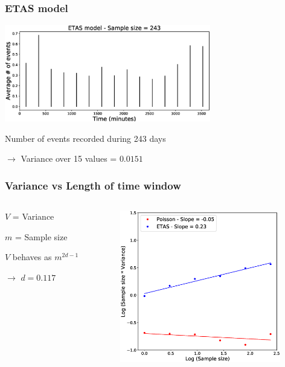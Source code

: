 \documentclass{beamer}
\begin{document}
	\begin{frame}
		\frametitle{ETAS model}
		\begin{center}
			\includegraphics[width=9cm, trim={1cm 0cm 3cm 0cm}, clip]{longrange/ETAS_6.eps}
		\end{center}
		Number of events recorded during 243 days

		$\rightarrow$ Variance over 15 values = $0.0151$
	\end{frame}

	\begin{frame}
		\frametitle{Variance vs Length of time window}
		\begin{columns}[c]
			\begin{column}{4cm}
				$V$ = Variance

				\vspace{1em}

				$m$ = Sample size

				\vspace{1em}

				$V$ behaves as $m^{2 d - 1}$

				\vspace{1em}

				$\rightarrow$ $d =  0.117$
			\end{column}
			\begin{column}{7cm}
				\begin{center}
					\includegraphics[width=7cm, trim={0cm 1cm 2cm 2cm}, clip]{longrange/comparison_2.eps}
				\end{center}
			\end{column}
		\end{columns}
	\end{frame}
\end{document}
